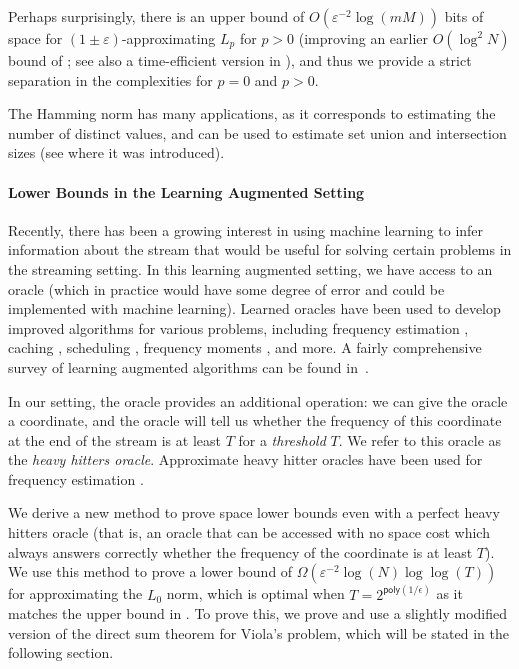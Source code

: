 \documentclass[11pt]{article}
\numberwithin{equation}{section}
\theoremstyle{definition}
\theoremstyle{plain}
\newcommand{\poly}{\mathsf{poly}}
\newcommand{\gap}{\ensuremath{\varepsilon}}
\newcommand{\bigo}[1]{\ensuremath{{{O} \left( {#1} \right)}}}
\newcommand{\bigomega}[1]{\ensuremath{{\Omega \left( {#1} \right)}}}
\begin{document}
Perhaps surprisingly, 
there is an upper bound of $\bigo{\gap^{-2}\log(mM)}$ bits of space for $(1\pm\gap)$-approximating
$L_p$ for $p>0$ \cite{knw10b}  (improving an earlier $\bigo{\log^2 N}$ bound of \cite{i06}; see also a time-efficient version in \cite{knpw11}), 
and thus we provide 
a strict separation in the complexities for $p = 0$ and $p > 0$. 

The Hamming norm has many applications, as it corresponds to estimating the number of distinct values, and can be used to estimate set union and intersection sizes (see \cite{CDIM03} where it was introduced).

\paragraph*{Lower Bounds in the Learning Augmented Setting}

Recently, there has been a growing interest in using machine learning to infer information about the stream that would be useful for solving certain problems in the streaming setting. In this learning augmented setting, we have access to an oracle (which in practice would have some degree of error and could be implemented with machine learning).  Learned oracles have been used to develop improved algorithms for various problems, including frequency estimation \cite{hsu2018learningbased}, caching \cite{lykouris2018competitive}, scheduling \cite{mitzenmacher_scheduling_2020}, frequency moments \cite{Jiang2020Learning-Augmented}, and more. A fairly comprehensive survey of learning augmented algorithms can be found %
in~\cite{DBLP:books/cu/20/MitzenmacherV20}.  %

In our setting, the oracle provides an additional operation: we can give the oracle a coordinate, and the oracle will tell us whether the frequency of this coordinate at the end of the stream is at least $T$ for a \emph{threshold} $T$. We refer to this oracle as the \emph{heavy hitters oracle}. Approximate heavy hitter oracles have been used for frequency estimation \cite{hsu2018learningbased}.

%
 We derive a new method %
%
%
to prove space lower bounds even with a perfect heavy hitters oracle {\color{black}(that is, an oracle that can be accessed with no space cost which always answers correctly whether the frequency of the coordinate is at least $T$)}. We use this method to prove a lower bound of $\bigomega{\gap^{-2}\log(N)\log\log(T)}$ for approximating the $L_0$ norm, which is optimal when $T = 2^{\poly(1/\epsilon)}$ as it matches the upper bound in \cite{Jiang2020Learning-Augmented}. {\color{black}To prove this, we prove and use a slightly modified version of the direct sum theorem for Viola's problem, which will be stated in the following section.}
\end{document}

